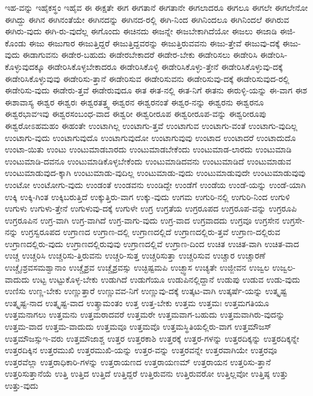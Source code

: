 {ಇಹ-ವನ್ನು
ಇಹೈಕಸ್ಥಂ
ಇಹೈವ
ಈ
ಈಕ್ಷತೇ
ಈಗ
ಈಗತಾನೆ
ಈಗತಾನೇ
ಈಗಲಾದರೂ
ಈಗಲೂ
ಈಗಲೇ
ಈಗಲೇನೋ
ಈಗಿದ್ದು
ಈಗಿನ
ಈಗಿನಂತೆಯೇ
ಈಗಿನದನ್ನು
ಈಗಿನದ-ರಲ್ಲಿ
ಈಗಿ-ನಿಂದ
ಈಗಿನಿಂದಲೂ
ಈಗಿನಿಂದಲೆ
ಈಗಿರುವ
ಈಗಿರು-ವುದು
ಈಗಿ-ರು-ವುದೆಲ್ಲ
ಈಗೊಂದು
ಈಚಿನದು
ಈಜನ್ನೇ
ಈಜಬೇಕಾಗಿದೆಯೋ
ಈಜಲು
ಈಜಾಡಿ
ಈಜಿ-ಕೊಂಡು
ಈಜು
ಈಜುಗಾರ
ಈಜುತ್ತಿದ್ದರೆ
ಈಜುತ್ತಿದ್ದವರನ್ನು
ಈಜುತ್ತಿರುವವನು
ಈಜು-ತ್ತೇವೆ
ಈಜುವು-ದಕ್ಕೆ
ಈಜು-ವುದು
ಈಡಾಗುವನು
ಈಡೇರ-ಬಹುದು
ಈಡೇರಬೇಕಾದರೆ
ಈಡೇರ-ಬೇಕು
ಈಡೇರಿಸಲು
ಈಡೇರಿಸಿ
ಈಡೇರಿಸಿ-ಕೊಳ್ಳುವುದಕ್ಕೂ
ಈಡೇರಿಸಿಕೊಳ್ಳಬೇಕಾದರೂ
ಈಡೇರಿಸಿಕೊಳ್ಳಿ
ಈಡೇರಿಸಿಕೊಳ್ಳು-ತ್ತೇನೆ
ಈಡೇರಿಸಿಕೊಳ್ಳುವು-ದಕ್ಕೆ
ಈಡೇರಿಸಿಕೊಳ್ಳುವುವು
ಈಡೇರಿಸು-ತ್ತಾನೆ
ಈಡೇರಿಸುವ
ಈಡೇರಿಸುವನು
ಈಡೇರಿಸುವು-ದಕ್ಕೆ
ಈಡೇರಿಸುವುದ-ರಲ್ಲಿ
ಈಡೇರಿಸು-ವುದು
ಈಡೇರು-ತ್ತವೆ
ಈಡೇರುವುದೂ
ಈತ
ಈತ-ನಲ್ಲಿ
ಈತ-ನಿಗೆ
ಈತನು
ಈರುಳ್ಳಿ-ಯನ್ನು
ಈ-ವಾಗ
ಈಶ
ಈಶಾವಾಸ್ಯ
ಈಶ್ವರ
ಈಶ್ವರಃ
ಈಶ್ವರತತ್ತ್ವ
ಈಶ್ವರನ
ಈಶ್ವರನಂತೆ
ಈಶ್ವರ-ನನ್ನು
ಈಶ್ವರನು
ಈಶ್ವರನೂ
ಈಶ್ವರಭಾವಇವು
ಈಶ್ವರಸಂಬಂಧ-ವಾದ
ಈಶ್ವರೀ
ಈಶ್ವರೀರೂಪ
ಈಶ್ವರೀರೂಪ-ವನ್ನು
ಈಶ್ವರೀರೂಪು
ಈಶ್ವರೋಽಹಮಹಂ
ಈಹಂತೇ
ಉಂಟಾಗಿಲ್ಲ
ಉಂಟಾಗು-ತ್ತವೆ
ಉಂಟಾಗುವ
ಉಂಟಾಗು-ವಂತೆ
ಉಂಟಾಗು-ವುದಿಲ್ಲ
ಉಂಟಾಗು-ವುದು
ಉಂಟಾಗುವುದೊ
ಉಂಟಾಗುವುದೋ
ಉಂಟಾಗುವುವು
ಉಂಟಾದ
ಉಂಟಾದರೆ
ಉಂಟಾದುದೊ
ಉಂಟಾ-ಯಿತು
ಉಂಟು
ಉಂಟುಮಾಡಬಾರದು
ಉಂಟುಮಾಡಬೇಕೆಂದು
ಉಂಟುಮಾಡ-ಲಾರದು
ಉಂಟುಮಾಡಿ
ಉಂಟುಮಾಡಿ-ದವನೂ
ಉಂಟುಮಾಡಿಕೊಳ್ಳಬೇಕೆಂದು
ಉಂಟುಮಾಡಿದವನು
ಉಂಟುಮಾಡಿದೆ
ಉಂಟುಮಾಡುವ
ಉಂಟುಮಾಡುವುದ-ಕ್ಕಾಗಿ
ಉಂಟುಮಾಡು-ವುದಿಲ್ಲ
ಉಂಟುಮಾಡು-ವುದು
ಉಂಟುಮಾಡುವುದೇ
ಉಂಟುಮಾಡುವುವು
ಉಂಟೋ
ಉಂಟೋಗು-ವುದು
ಉಂಡಂತೆ
ಉಂಡವನು
ಉಂಡಿದ್ದೇ
ಉಂಡೆಗೆ
ಉಂಡೆಯ
ಉಂಡೆ-ಯನ್ನು
ಉಂಡೆ-ಯಾಗಿ
ಉಕ್ಕಿ
ಉಕ್ಕಿ-ಗಿಂತ
ಉಕ್ಕಿಬರುತ್ತಿದೆ
ಉಕ್ಕುತ್ತಿರು-ವಾಗ
ಉಕ್ಕು-ವುದು
ಉಗಮ
ಉಗುರಿ-ನಲ್ಲಿ
ಉಗುರಿ-ನಿಂದ
ಉಗುಳಿ
ಉಗುಳು
ಉಗುಳು-ತ್ತೇನೆ
ಉಗುಳುವು-ದಕ್ಕೆ
ಉಗುಳೇ
ಉಗ್ರ
ಉಗ್ರತೆಯ
ಉಗ್ರರೂಪದ
ಉಗ್ರರೂಪ-ವನ್ನು
ಉಗ್ರರೂಪಿ
ಉಗ್ರರೂಪಿನ
ಉಗ್ರ-ವಾಗಿ
ಉಗ್ರ-ವಾಗಿದೆ
ಉಗ್ರ-ವಾಗು-ವುದು
ಉಗ್ರ-ವಾದ
ಉಗ್ರವಾದದು
ಉಗ್ರವೂ
ಉಗ್ರಸೇನ
ಉಗ್ರಸೇ-ನನ್ನು
ಉಗ್ರಸ್ವರೂಪದ
ಉಗ್ರಾಣದ
ಉಗ್ರಾಣ-ದಲ್ಲಿ
ಉಗ್ರಾಣದಲ್ಲಿದೆ
ಉಗ್ರಾಣದಲ್ಲಿರು-ತ್ತವೆ
ಉಗ್ರಾಣ-ದಲ್ಲಿರುವ
ಉಗ್ರಾಣದಲ್ಲಿರು-ವುದು
ಉಗ್ರಾಣದಲ್ಲಿರುವುವು
ಉಗ್ರಾಣದಲ್ಲಿವೆ
ಉಗ್ರಾಣ-ದಿಂದ
ಉಚಿತ
ಉಚಿತ-ವಾಗಿ
ಉಚಿತ-ವಾದ
ಉಚ್ಚ
ಉಚ್ಚರಿಸಿ
ಉಚ್ಚರಿಸು-ತ್ತಿರುವನು
ಉಚ್ಚರಿ-ಸುತ್ತ
ಉಚ್ಚರಿಸುತ್ತಾ
ಉಚ್ಚರಿಸುವ
ಉಚ್ಚಾರ
ಉಚ್ಚಾರಣೆ
ಉಚ್ಚೈಃಶ್ರವಸಮಶ್ವಾನಾಂ
ಉಚ್ಚೈಶ್ರವ
ಉಚ್ಚೈಶ್ರವಸ್ಸು
ಉಚ್ಛಿಷ್ಟಮಪಿ
ಉಚ್ಛ್ವಾಸ
ಉಚ್ಯತೇ
ಉಜ್ಜೀವನ
ಉಜ್ವಲ
ಉಜ್ವಲ-ವಾದುದು
ಉಟ್ಟ
ಉಟ್ಟುಕೊಳ್ಳ-ಬೇಕು
ಉಡುಗಿದೆ
ಉಡುಗೆಯೂ
ಉಡುಪಿನಲ್ಲಿದ್ದಾನೆ
ಉಡುಪು
ಉಡುವ
ಉಡು-ವುದು
ಉಣಿಸು
ಉಣ್ಣ-ಬೇಕು
ಉಣ್ಣುತ್ತಾರೆ
ಉಣ್ಣುವವ-ನಿಗೆ
ಉಣ್ಣುವು-ದಕ್ಕೆ
ಉತ್ಕಟ-ವಾಗಿ
ಉತ್ಕರ್ಷೆ-ಯನ್ನು
ಉತ್ಕೃಷ್ಟ
ಉತ್ಕೃಷ್ಟ-ನಾದ
ಉತ್ಕೃಷ್ಟ-ವಾದ
ಉತ್ಕ್ರಾಮಂತಂ
ಉತ್ತ
ಉತ್ತ-ಬೇಕು
ಉತ್ತಮ
ಉತ್ತಮಃ
ಉತ್ತಮಗತಿಯೂ
ಉತ್ತಮನಾಗಲು
ಉತ್ತಮನು
ಉತ್ತಮರಾದವರೆ
ಉತ್ತಮರೇ
ಉತ್ತಮವಾಗ-ಬಹುದು
ಉತ್ತಮವಾಗಿರು-ವುದನ್ನು
ಉತ್ತಮ-ವಾದ
ಉತ್ತಮ-ವಾದುದು
ಉತ್ತಮವೂ
ಉತ್ತಮವೊ
ಉತ್ತಮಸ್ಥಿತಿಯಲ್ಲಿರು-ವಾಗ
ಉತ್ತಮೌಜಸ್
ಉತ್ತಮೌಜಸ್ಸುಇ-ವರು
ಉತ್ತಮೌಜಾಶ್ಚ
ಉತ್ತರ
ಉತ್ತರಕಾಶಿ
ಉತ್ತರಕ್ಕೆ
ಉತ್ತರ-ಗಳನ್ನು
ಉತ್ತರದಿಕ್ಕನ್ನು
ಉತ್ತರದಿಕ್ಕನ್ನೇ
ಉತ್ತರದಿಕ್ಕಿನ
ಉತ್ತರಮುಖಿ
ಉತ್ತರಮುಖಿ-ಯನ್ನು
ಉತ್ತರ-ವನ್ನು
ಉತ್ತರವನ್ನೇ
ಉತ್ತರವಾಗಿಯೇ
ಉತ್ತರವೂ
ಉತ್ತರವೆಲ್ಲಾ
ಉತ್ತರಾಧಿಕಾರಿ-ಗಳನ್ನು
ಉತ್ತರಾಯಣದ
ಉತ್ತರಾಯಣಮ್
ಉತ್ತರಾಯನ
ಉತ್ತರಿಸು-ತ್ತಾನೆ
ಉತ್ತರಿಸುತ್ತಾನೆಯೆ
ಉತ್ತಿ
ಉತ್ತಿದ
ಉತ್ತಿದೆ
ಉತ್ತಿದ್ದರೆ
ಉತ್ತಿರುವನು
ಉತ್ತಿರುವರೋ
ಉತ್ತಿಲ್ಲವೋ
ಉತ್ತಿಷ್ಠ
ಉತ್ತು
ಉತ್ತು-ವುದು
}
